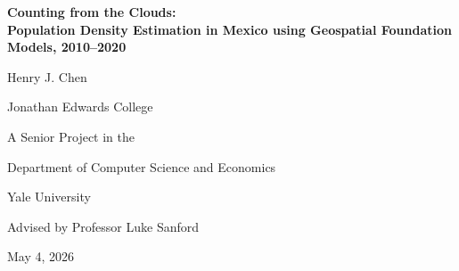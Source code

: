 \documentclass[12pt,letterpaper]{article}
\newcommand{\thesistitle}{Counting from the Clouds: \\
\textmd{Population Density Estimation in Mexico using Geospatial Foundation Models, 2010--2020}}
\begin{document}
\hypersetup{pageanchor=false}
\begin{titlepage}
  \thispagestyle{empty}
  \singlespacing
  \centering
  \vspace*{1.25in}

  {\bfseries\thesistitle\par}
  \vspace{0.6em}

  \vspace{1.25in}

  { Henry J. Chen\par}
  { Jonathan Edwards College\par}

  \vfill

  { A Senior Project in the\par}
  { Department of Computer Science and Economics\par}
  { Yale University\par}

  \vfill

  { Advised by Professor Luke Sanford\par}

  {May 4, 2026\par}
  \vspace*{0.5in}
\end{titlepage}
\hypersetup{pageanchor=true}

\end{document}
